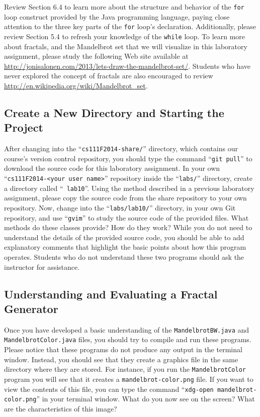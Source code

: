 Review Section 6.4 to learn more about the structure and behavior of the {\tt for} loop construct provided by the Java
programming language, paying close attention to the three key parts of the {\tt for} loop's declaration. Additionally,
please review Section 5.4 to refresh your knowledge of the {\tt while} loop. To learn more about fractals, and the
Mandelbrot set that we will visualize in this laboratory assignment, please study the following Web site available at
\url{http://jonisalonen.com/2013/lets-draw-the-mandelbrot-set/}. Students who have never explored the concept of
fractals are also encouraged to review \url{http://en.wikipedia.org/wiki/Mandelbrot_set}.

\vspace{-0.1in}
\subsection*{Create a New Directory and Starting the Project}
\vspace{-0.05in}

After changing into the ``{\tt cs111F2014-share/}'' directory, which contains our course's version control repository,
you should type the command ``{\tt git pull}'' to download the source code for this laboratory assignment.  In your own
``{\tt cs111F2014-<your user name>}'' repository inside the ``{\tt labs/}'' directory, create a directory called ``{\tt
  lab10}''. Using the method described in a previous laboratory assignment, please copy the source code from the share
repository to your own repository. Now, change into the ``{\tt labs/lab10/}'' directory, in your own Git repository, and
use ``{\tt gvim}'' to study the source code of the provided files. What methods do these classes provide? How do they
work? While you do not need to understand the details of the provided source code, you should be able to add explanatory
comments that highlight the basic points about how this program operates. Students who do not understand these two programs
should ask the instructor for assistance.

\vspace{-0.1in}
\subsection*{Understanding and Evaluating a Fractal Generator}
\vspace{-0.05in}

Once you have developed a basic understanding of the {\tt MandelbrotBW.java} and {\tt MandelbrotColor.java} files, you
should try to compile and run these programs. Please notice that these programs do not produce any output in the
terminal window.  Instead, you should see that they create a graphics file in the same directory where they are stored.
For instance, if you run the {\tt MandelbrotColor} program you will see that it creates a {\tt mandelbrot-color.png}
file.  If you want to view the contents of this file, you can type the command ``{\tt xdg-open mandelbrot-color.png}''
in your terminal window.  What do you now see on the screen? What are the characteristics of this image?

